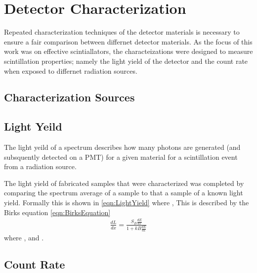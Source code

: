 \section{Detector Characterization}
Repeated characterization techniques of the detector materials is necessary to ensure a fair comparison between differnet detector materials.
As the focus of this work was on effective scintiallators, the characteizations were designed to measure scintillation properties; namely the light yield of the detector and the count rate when exposed to differnet radiation sources.

\subsection{Characterization Sources}

\subsection{Light Yeild}
The light yeild of a spectrum describes how many photons are generated (and subsquently detected on a PMT) for a given material for a scintillation event from a radiation source.

The light yield of fabricated samples that were characterized was completed by comparing the spectrum average of a sample to that a sample of a known light yield.
Formally this is shown in \eqref{eqn:LightYield} where , 
This is described by the Birks equation \eqref{eqn:BirksEquation}
\begin{align}
  \label{eqn:BirksEquation}
  \frac{dL}{dx} = \frac{S_B\frac{dE}{dx}}{1+kB\frac{dE}{dx}}
\end{align}
where , and .

\subsection{Count Rate}
